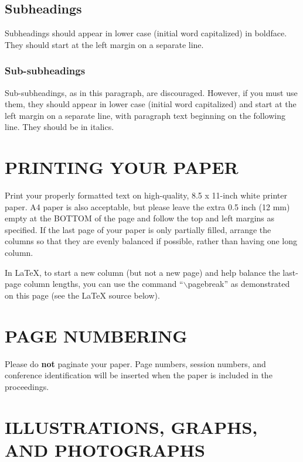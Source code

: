 \documentclass{article}
\begin{document}
\subsection{Subheadings}
\label{ssec:subhead}

Subheadings should appear in lower case (initial word capitalized) in
boldface.  They should start at the left margin on a separate line.
 
\subsubsection{Sub-subheadings}
\label{sssec:subsubhead}

Sub-subheadings, as in this paragraph, are discouraged. However, if you
must use them, they should appear in lower case (initial word
capitalized) and start at the left margin on a separate line, with paragraph
text beginning on the following line.  They should be in italics.

\section{PRINTING YOUR PAPER}
\label{sec:print}

Print your properly formatted text on high-quality, 8.5 x 11-inch white printer
paper. A4 paper is also acceptable, but please leave the extra 0.5 inch (12 mm)
empty at the BOTTOM of the page and follow the top and left margins as
specified.  If the last page of your paper is only partially filled, arrange
the columns so that they are evenly balanced if possible, rather than having
one long column.

In LaTeX, to start a new column (but not a new page) and help balance the
last-page column lengths, you can use the command ``$\backslash$pagebreak'' as
demonstrated on this page (see the LaTeX source below).

\section{PAGE NUMBERING}
\label{sec:page}

Please do {\bf not} paginate your paper.  Page numbers, session numbers, and
conference identification will be inserted when the paper is included in the
proceedings.

\section{ILLUSTRATIONS, GRAPHS, AND PHOTOGRAPHS}
\label{sec:illust}
\end{document}
